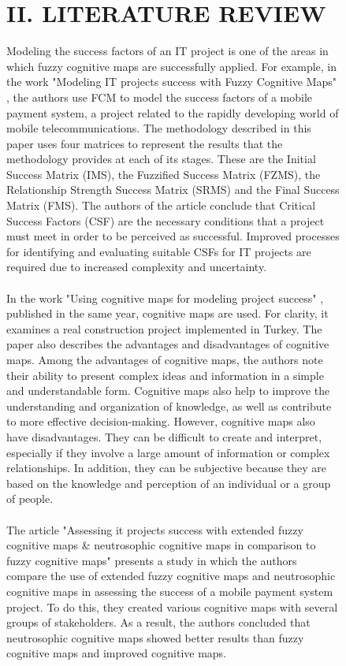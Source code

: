 \documentclass{article}
\begin{document}
\begin{figure}[!t]
\begin{minipage}{0.49\textwidth}
\begin{center}
                \chapter{II. LITERATURE REVIEW}
            \end{center}
            Modeling the success factors of an IT project is one of the areas in which fuzzy cognitive maps are successfully applied. For example, in the work "{}Modeling IT projects success with Fuzzy Cognitive Maps"{} \cite{litlink18}, the authors use FCM to model the success factors of a mobile payment system, a project related to the rapidly developing world of mobile telecommunications. The methodology described in this paper uses four matrices to represent the results that the methodology provides at each of its stages. These are the Initial Success Matrix (IMS), the Fuzzified Success Matrix (FZMS), the Relationship Strength Success Matrix (SRMS) and the Final Success Matrix (FMS). The authors of the article conclude that Critical Success Factors (CSF) are the necessary conditions that a project must meet in order to be perceived as successful. Improved processes for identifying and evaluating suitable CSFs for IT projects are required due to increased complexity and uncertainty.\\
            ~\\
            In the work "{}Using cognitive maps for modeling project success"{} \cite{litlink19}, published in the same year, cognitive maps are used. For clarity, it examines a real construction project implemented in Turkey. The paper also describes the advantages and disadvantages of cognitive maps. Among the advantages of cognitive maps, the authors note their ability to present complex ideas and information in a simple and understandable form. Cognitive maps also help to improve the understanding and organization of knowledge, as well as contribute to more effective decision-making. However, cognitive maps also have disadvantages. They can be difficult to create and interpret, especially if they involve a large amount of information or complex relationships. In addition, they can be subjective because they are based on the knowledge and perception of an individual or a group of people.\\
            ~\\
            The article "{}Assessing it projects success with extended fuzzy cognitive maps \& neutrosophic cognitive maps in comparison to fuzzy cognitive maps"{} \cite{litlink20} presents a study in which the authors compare the use of extended fuzzy cognitive maps and neutrosophic cognitive maps in assessing the success of a mobile payment system project. To do this, they created various cognitive maps with several groups of stakeholders. As a result, the authors concluded that neutrosophic cognitive maps showed better results than fuzzy cognitive maps and improved cognitive maps.\\

\end{minipage}
\end{figure}
\end{document}

